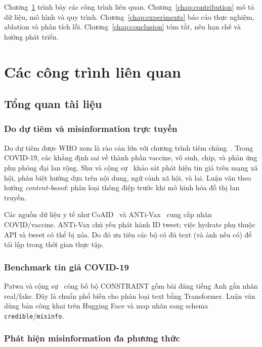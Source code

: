 \documentclass[12pt, a4paper]{report}
\begin{document}
Chương~\ref{chap:related-works} trình bày các công trình liên quan.
Chương~\ref{chap:contribution} mô tả dữ liệu, mô hình và quy trình.
Chương~\ref{chap:experiments} báo cáo thực nghiệm, ablation và phân tích lỗi.
Chương~\ref{chap:conclusion} tóm tắt, nêu hạn chế và hướng phát triển.

\chapter{Các công trình liên quan}
\label{chap:related-works}

\section{Tổng quan tài liệu}
\label{sec:literature-review}

\subsection{Do dự tiêm và misinformation trực tuyến}

Do dự tiêm được WHO xem là rào cản lớn với chương trình tiêm chủng~\cite{macdonald2015hesitancy}.
Trong COVID-19, các khẳng định sai về thành phần vaccine, vô sinh, chip, và phản ứng phụ phóng đại lan rộng.
Shu và cộng sự~\cite{shu2017fake} khảo sát phát hiện tin giả trên mạng xã hội, phân biệt hướng dựa trên nội dung, ngữ cảnh xã hội, và lai.
Luận văn theo hướng \emph{content-based}: phân loại thông điệp trước khi mô hình hóa đồ thị lan truyền.

Các nguồn dữ liệu y tế như CoAID~\cite{cui2020coaid} và ANTi-Vax~\cite{hayawi2022antivax} cung cấp nhãn COVID/vaccine.
ANTi-Vax chủ yếu phát hành ID tweet; việc hydrate phụ thuộc API và tweet có thể bị xóa.
Do đó ưu tiên các bộ có đủ text (và ảnh nếu có) để tái lập trong thời gian thực tập.

\subsection{Benchmark tin giả COVID-19}

Patwa và cộng sự~\cite{patwa2021fighting} công bố bộ CONSTRAINT gồm bài đăng tiếng Anh gắn nhãn real/fake.
Đây là chuẩn phổ biến cho phân loại text bằng Transformer.
Luận văn dùng bản công khai trên Hugging Face và map nhãn sang schema \texttt{credible}/\texttt{misinfo}.

\subsection{Phát hiện misinformation đa phương thức}
\end{document}
